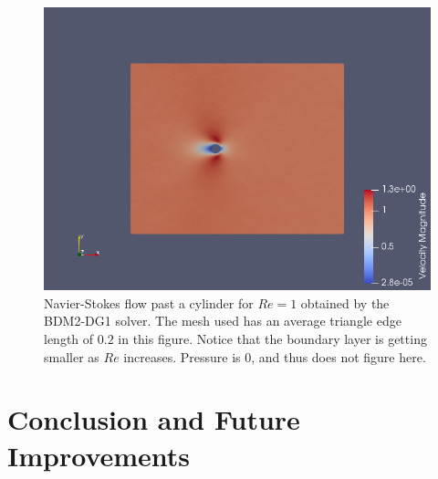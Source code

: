 \documentclass[11pt,twoside,a4paper]{article}
\begin{document}
\begin{figure}
  \includegraphics[width=\linewidth]{nscR1.png}
  \caption{Navier-Stokes flow past a cylinder for $Re = 1$ obtained by the BDM2-DG1 solver. The mesh used has an average triangle edge length of $0.2$ in this figure. Notice that the boundary layer is getting smaller as $Re$ increases. Pressure is $0$, and thus does not figure here.}
\end{figure}



\section{Conclusion and Future Improvements}
\end{document}
